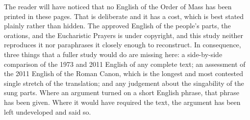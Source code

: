 The reader will have noticed that no English of the Order of Mass has been printed in these
pages. That is deliberate and it has a cost, which is best stated plainly rather than hidden.
The approved English of the people's parts, the orations, and the Eucharistic Prayers is under
copyright, and this study neither reproduces it nor paraphrases it closely enough to
reconstruct. In consequence, three things that a fuller study would do are missing here: a
side-by-side comparison of the 1973 and 2011 English of any complete text; an assessment of the
2011 English of the Roman Canon, which is the longest and most contested single stretch of the
translation; and any judgement about the singability of the sung parts. Where an argument turned
on a short English phrase, that phrase has been given. Where it would have required the text,
the argument has been left undeveloped and said so.
